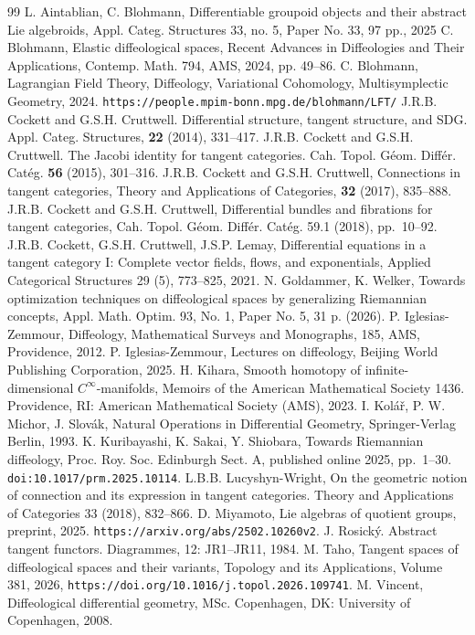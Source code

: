\documentclass{amsart}
\theoremstyle{definition}
\begin{document}
 
\begin{thebibliography}{99}
 L. Aintablian, C. Blohmann, Differentiable groupoid objects and their
  abstract Lie algebroids, Appl. Categ. Structures 33, no. 5, Paper No. 33, 97 pp., 2025
 C. Blohmann, Elastic diffeological spaces, Recent Advances in Diffeologies and Their Applications, Contemp. Math. 794, AMS, 2024, pp. 49–86.
 C. Blohmann, Lagrangian Field Theory, Diffeology, Variational Cohomology,
  Multisymplectic Geometry, 2024. {\tt https://people.mpim-bonn.mpg.de/blohmann/LFT/}
 J.R.B. Cockett and G.S.H. Cruttwell. Differential structure, tangent
  structure, and SDG. Appl. Categ. Structures, {\bf 22} (2014), 331--417.
 J.R.B. Cockett and G.S.H. Cruttwell. The Jacobi identity for tangent
  categories. Cah. Topol. G\'eom. Diff\'er. Cat\'eg. {\bf 56} (2015), 301--316.
 J.R.B. Cockett and G.S.H. Cruttwell, Connections in tangent categories,
  Theory and Applications of Categories, {\bf 32} (2017), 835--888.
 J.R.B. Cockett and G.S.H. Cruttwell, Differential bundles and fibrations
  for tangent categories, Cah. Topol. G\'eom. Diff\'er. Cat\'eg. 59.1 (2018), pp.\ 10--92.
 J.R.B. Cockett, G.S.H. Cruttwell, J.S.P. Lemay, Differential equations in
  a tangent category I: Complete vector fields, flows, and exponentials,
  Applied Categorical Structures 29 (5), 773--825, 2021.
 N. Goldammer, K. Welker, Towards optimization techniques on diffeological spaces by generalizing Riemannian concepts, Appl. Math. Optim. 93, No. 1, Paper No. 5, 31 p. (2026). 
 P. Iglesias-Zemmour, Diffeology, Mathematical Surveys and Monographs,
  185, AMS, Providence, 2012.
 P. Iglesias-Zemmour, Lectures on diffeology,
  Beijing World Publishing Corporation, 2025.
 H. Kihara, Smooth homotopy of infinite-dimensional $C^\infty$-manifolds,
  Memoirs of the American Mathematical Society 1436. Providence, RI: American Mathematical Society (AMS), 2023.
 I. Kol\'a\v{r}, P. W. Michor, J. Slov\'ak, Natural Operations in Differential Geometry, Springer-Verlag Berlin, 1993.
 K. Kuribayashi, K. Sakai, Y. Shiobara, Towards Riemannian diffeology,
  Proc. Roy. Soc. Edinburgh Sect. A, published online 2025, pp.\ 1--30.
  \texttt{doi:10.1017/prm.2025.10114}.
 L.B.B. Lucyshyn-Wright, On the geometric notion of connection and its
  expression in tangent categories. Theory and Applications of Categories 33 (2018), 832--866.
 D. Miyamoto, Lie algebras of quotient groups, preprint, 2025.
  {\tt https://arxiv.org/abs/2502.10260v2}.
 J. Rosick\'y. Abstract tangent functors. Diagrammes, 12: JR1--JR11, 1984.
 M. Taho, Tangent spaces of diffeological spaces and their variants,
Topology and its Applications, Volume 381, 2026, {\tt https://doi.org/10.1016/j.topol.2026.109741}.
 M. Vincent, Diffeological differential geometry, MSc. Copenhagen, DK: University of Copenhagen, 2008.  
\end{thebibliography}
 
\end{document}
